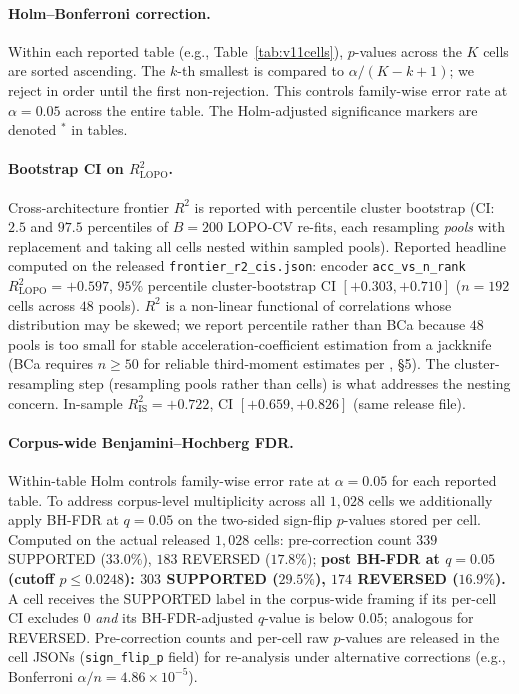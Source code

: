\documentclass[11pt]{article}
\begin{document}
\paragraph{Holm--Bonferroni correction.} Within each reported table (e.g., Table~\ref{tab:v11cells}), $p$-values across the $K$ cells are sorted ascending. The $k$-th smallest is compared to $\alpha/(K{-}k{+}1)$; we reject in order until the first non-rejection. This controls family-wise error rate at $\alpha{=}0.05$ across the entire table. The Holm-adjusted significance markers are denoted $^{*}$ in tables.

\paragraph{Bootstrap CI on $R^2_{\text{LOPO}}$.} Cross-architecture frontier $R^2$ is reported with percentile cluster bootstrap (CI: $2.5$ and $97.5$ percentiles of $B{=}200$ LOPO-CV re-fits, each resampling \emph{pools} with replacement and taking all cells nested within sampled pools). Reported headline computed on the released \texttt{frontier\_\allowbreak r2\_\allowbreak cis.\allowbreak json}: encoder \texttt{acc\_vs\_n\_rank} $R^2_{\text{LOPO}}{=}{+}0.597$, $95\%$ percentile cluster-bootstrap CI $[{+}0.303, {+}0.710]$ ($n{=}192$ cells across $48$ pools). $R^2$ is a non-linear functional of correlations whose distribution may be skewed; we report percentile rather than BCa because $48$ pools is too small for stable acceleration-coefficient estimation from a jackknife (BCa requires $n{\geq}50$ for reliable third-moment estimates per \citealp{diciccio1996}, \S5). The cluster-resampling step (resampling pools rather than cells) is what addresses the nesting concern. In-sample $R^2_{\text{IS}}{=}{+}0.722$, CI $[{+}0.659, {+}0.826]$ (same release file).

\paragraph{Corpus-wide Benjamini--Hochberg FDR.} Within-table Holm controls family-wise error rate at $\alpha{=}0.05$ for each reported table. To address corpus-level multiplicity across all $1{,}028$ cells we additionally apply BH-FDR \citep{bh1995} at $q{=}0.05$ on the two-sided sign-flip $p$-values stored per cell. Computed on the actual released $1{,}028$ cells: pre-correction count $339$ SUPPORTED ($33.0\%$), $183$ REVERSED ($17.8\%$); \textbf{post BH-FDR at $q{=}0.05$ (cutoff $p{\leq}0.0248$): $303$ SUPPORTED ($29.5\%$), $174$ REVERSED ($16.9\%$).} A cell receives the SUPPORTED label in the corpus-wide framing if its per-cell CI excludes $0$ \emph{and} its BH-FDR-adjusted $q$-value is below $0.05$; analogous for REVERSED. Pre-correction counts and per-cell raw $p$-values are released in the cell JSONs (\texttt{sign\_flip\_p} field) for re-analysis under alternative corrections (e.g., Bonferroni $\alpha/n{=}4.86{\times}10^{-5}$).
\end{document}
